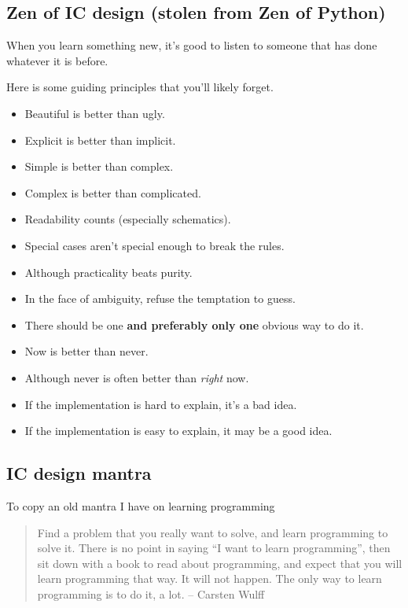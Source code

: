 \subsection{Zen of IC design (stolen from Zen of
Python)}\label{zen-of-ic-design-stolen-from-zen-of-python}

When you learn something new, it's good to listen to someone that has
done whatever it is before.

Here is some guiding principles that you'll likely forget.

\begin{itemize}
\item
  Beautiful is better than ugly.
\item
  Explicit is better than implicit.
\item
  Simple is better than complex.
\item
  Complex is better than complicated.
\item
  Readability counts (especially schematics).
\item
  Special cases aren't special enough to break the rules.
\item
  Although practicality beats purity.
\item
  In the face of ambiguity, refuse the temptation to guess.
\item
  There should be one \textbf{and preferably only one} obvious way to do
  it.
\item
  Now is better than never.
\item
  Although never is often better than \emph{right} now.
\item
  If the implementation is hard to explain, it's a bad idea.
\item
  If the implementation is easy to explain, it may be a good idea.
\end{itemize}

\subsection{IC design mantra}\label{ic-design-mantra}

To copy an old mantra I have on learning programming

\begin{quote}
Find a problem that you really want to solve, and learn programming to
solve it. There is no point in saying ``I want to learn programming'',
then sit down with a book to read about programming, and expect that you
will learn programming that way. It will not happen. The only way to
learn programming is to do it, a lot. -- Carsten Wulff
\end{quote}

